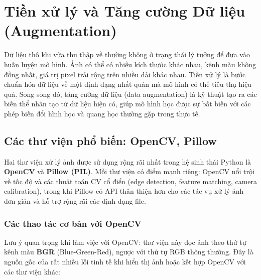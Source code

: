 \section{Tiền xử lý và Tăng cường Dữ liệu (Augmentation)}
\label{sec:preprocessing_augmentation}

Dữ liệu thô khi vừa thu thập về thường không ở trạng thái lý tưởng để đưa vào huấn luyện mô hình. Ảnh có thể có nhiều kích thước khác nhau, kênh màu không đồng nhất, giá trị pixel trải rộng trên nhiều dải khác nhau. Tiền xử lý là bước chuẩn hóa dữ liệu về một định dạng nhất quán mà mô hình có thể tiêu thụ hiệu quả. Song song đó, tăng cường dữ liệu (data augmentation) là kỹ thuật tạo ra các biến thể nhân tạo từ dữ liệu hiện có, giúp mô hình học được sự bất biến với các phép biến đổi hình học và quang học thường gặp trong thực tế.

\subsection{Các thư viện phổ biến: OpenCV, Pillow}
\label{subsec:opencv_pillow}

Hai thư viện xử lý ảnh được sử dụng rộng rãi nhất trong hệ sinh thái Python là \textbf{OpenCV} và \textbf{Pillow (PIL)}. Mỗi thư viện có điểm mạnh riêng: OpenCV nổi trội về tốc độ và các thuật toán CV cổ điển (edge detection, feature matching, camera calibration), trong khi Pillow có API thân thiện hơn cho các tác vụ xử lý ảnh đơn giản và hỗ trợ rộng rãi các định dạng file.

\subsubsection{Các thao tác cơ bản với OpenCV}

Lưu ý quan trọng khi làm việc với OpenCV: thư viện này đọc ảnh theo thứ tự kênh màu \textbf{BGR} (Blue-Green-Red), ngược với thứ tự RGB thông thường. Đây là nguồn gốc của rất nhiều lỗi tinh tế khi hiển thị ảnh hoặc kết hợp OpenCV với các thư viện khác:

